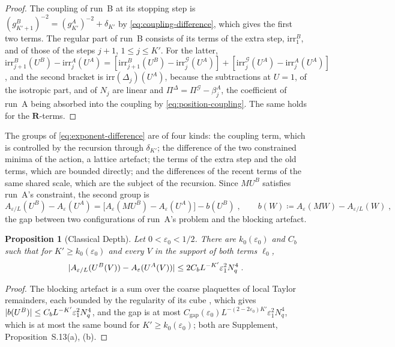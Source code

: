 \documentclass[11pt]{preprint}
\DeclarePairedDelimiter{\abs}{\lvert}{\rvert}
\numberwithin{equation}{section}
\newtheorem{proposition}[theorem]{Proposition}
\theoremstyle{definition}
\theoremstyle{remark}
\theoremstyle{plain}
\begin{document}
\begin{proof}
The coupling of run~B at its stopping step is $(g^B_{K'+1})^{-2} = (g^A_{K'})^{-2} + \delta_{K'}$ by \eqref{eq:coupling-difference}, which gives the first two terms. The regular part of run~B consists of its terms of the extra step, $\mathrm{irr}^B_1$, and of those of the steps $j + 1$, $1 \leq j \leq K'$. For the latter, $\mathrm{irr}^B_{j+1}(U^B) - \mathrm{irr}^A_j(U^A) = [\mathrm{irr}^B_{j+1}(U^B) - \mathrm{irr}^{\mathcal G}_j(U^A)] + [\mathrm{irr}^{\mathcal G}_j(U^A) - \mathrm{irr}^A_j(U^A)]$, and the second bracket is $\mathrm{irr}(\Delta_j)(U^A)$, because the subtractions at $U = 1$, of the isotropic part, and of $N_j$ are linear and $\Pi^\Delta = \Pi^{\mathcal G} - \beta^A_j$, the coefficient of run~A being absorbed into the coupling by \eqref{eq:position-coupling}. The same holds for the $\mathbf R$-terms.
\end{proof}

The groups of \eqref{eq:exponent-difference} are of four kinds: the coupling term, which is controlled by the recursion through $\delta_{K'}$; the difference of the two constrained minima of the action, a lattice artefact; the terms of the extra step and the old terms, which are bounded directly; and the differences of the recent terms of the same shared scale, which are the subject of the recursion. Since $MU^B$ satisfies run~A's constraint, the second group is
\begin{equation}\label{eq:minima-difference}
    A_{\varepsilon/L}(U^B) - A_\varepsilon(U^A) = \bigl[A_\varepsilon(MU^B) - A_\varepsilon(U^A)\bigr] - b(U^B)\;,
    \qquad
    b(W) \coloneqq A_\varepsilon(MW) - A_{\varepsilon/L}(W)\;,
\end{equation}
the gap between two configurations of run~A's problem and the blocking artefact.

\begin{proposition}[Classical Depth]\label{prop:classical-depth}
Let $0 < \varepsilon_0 < 1/2$. There are $k_0(\varepsilon_0)$ and $C_b$ such that for $K' \geq k_0(\varepsilon_0)$ and every $V$ in the support of both terms $\ell_0$,
\begin{equation}\label{eq:classical-depth}
    \abs{A_{\varepsilon/L}(U^B(V)) - A_\varepsilon(U^A(V))} \leq 2C_bL^{-K'}\varepsilon_1^2N_q^4\;.
\end{equation}
\end{proposition}

\begin{proof}
The blocking artefact is a sum over the coarse plaquettes of local Taylor remainders, each bounded by the regularity of its cube \cite[Theorem~1, (9), (10), p.~279]{BalabanVAR}, which gives $\abs{b(U^B)} \leq C_bL^{-K'}\varepsilon_1^2N_q^4$, and the gap is at most $C_{\mathrm{gap}}(\varepsilon_0)L^{-(2-2\varepsilon_0)K'}\varepsilon_1^2N_q^4$, which is at most the same bound for $K' \geq k_0(\varepsilon_0)$; both are Supplement, Proposition~S.13(a), (b).
\end{proof}
\end{document}
